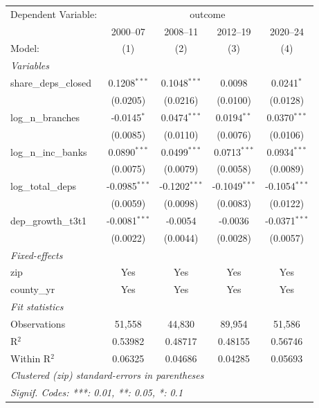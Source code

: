 \begingroup
\centering
\begin{tabular}{lcccc}
   \tabularnewline \midrule \midrule
   Dependent Variable: & \multicolumn{4}{c}{outcome}\\
                         & 2000–07         & 2008–11         & 2012–19         & 2020–24 \\   
   Model:                & (1)             & (2)             & (3)             & (4)\\  
   \midrule
   \emph{Variables}\\
   share\_deps\_closed   & 0.1208$^{***}$  & 0.1048$^{***}$  & 0.0098          & 0.0241$^{*}$\\   
                         & (0.0205)        & (0.0216)        & (0.0100)        & (0.0128)\\   
   log\_n\_branches      & -0.0145$^{*}$   & 0.0474$^{***}$  & 0.0194$^{**}$   & 0.0370$^{***}$\\   
                         & (0.0085)        & (0.0110)        & (0.0076)        & (0.0106)\\   
   log\_n\_inc\_banks    & 0.0890$^{***}$  & 0.0499$^{***}$  & 0.0713$^{***}$  & 0.0934$^{***}$\\   
                         & (0.0075)        & (0.0079)        & (0.0058)        & (0.0089)\\   
   log\_total\_deps      & -0.0985$^{***}$ & -0.1202$^{***}$ & -0.1049$^{***}$ & -0.1054$^{***}$\\   
                         & (0.0059)        & (0.0098)        & (0.0083)        & (0.0122)\\   
   dep\_growth\_t3t1     & -0.0081$^{***}$ & -0.0054         & -0.0036         & -0.0371$^{***}$\\   
                         & (0.0022)        & (0.0044)        & (0.0028)        & (0.0057)\\   
   \midrule
   \emph{Fixed-effects}\\
   zip                   & Yes             & Yes             & Yes             & Yes\\  
   county\_yr            & Yes             & Yes             & Yes             & Yes\\  
   \midrule
   \emph{Fit statistics}\\
   Observations          & 51,558          & 44,830          & 89,954          & 51,586\\  
   R$^2$                 & 0.53982         & 0.48717         & 0.48155         & 0.56746\\  
   Within R$^2$          & 0.06325         & 0.04686         & 0.04285         & 0.05693\\  
   \midrule \midrule
   \multicolumn{5}{l}{\emph{Clustered (zip) standard-errors in parentheses}}\\
   \multicolumn{5}{l}{\emph{Signif. Codes: ***: 0.01, **: 0.05, *: 0.1}}\\
\end{tabular}
\par\endgroup
